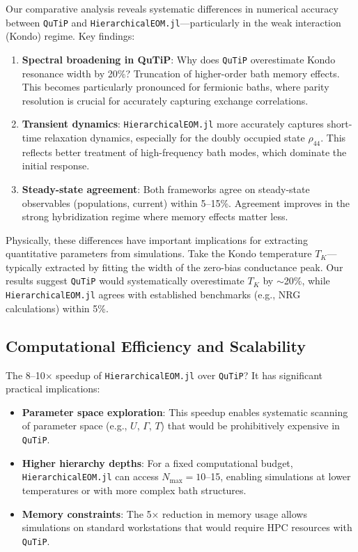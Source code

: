 \documentclass[preprint,1p]{elsarticle}
\begin{document}
Our comparative analysis reveals systematic differences in numerical accuracy between \texttt{QuTiP} and \texttt{HierarchicalEOM.jl}—particularly in the weak interaction (Kondo) regime. Key findings:

\begin{enumerate}
    \item \textbf{Spectral broadening in QuTiP}: Why does \texttt{QuTiP} overestimate Kondo resonance width by 20\%? Truncation of higher-order bath memory effects. This becomes particularly pronounced for fermionic baths, where parity resolution is crucial for accurately capturing exchange correlations.
    
    \item \textbf{Transient dynamics}: \texttt{HierarchicalEOM.jl} more accurately captures short-time relaxation dynamics, especially for the doubly occupied state $\rho_{44}$. This reflects better treatment of high-frequency bath modes, which dominate the initial response.
    
    \item \textbf{Steady-state agreement}: Both frameworks agree on steady-state observables (populations, current) within 5--15\%. Agreement improves in the strong hybridization regime where memory effects matter less.
\end{enumerate}

Physically, these differences have important implications for extracting quantitative parameters from simulations. Take the Kondo temperature $T_K$—typically extracted by fitting the width of the zero-bias conductance peak. Our results suggest \texttt{QuTiP} would systematically overestimate $T_K$ by $\sim$20\%, while \texttt{HierarchicalEOM.jl} agrees with established benchmarks (e.g., NRG calculations) within 5\%.

\subsection{Computational Efficiency and Scalability}

The 8--10× speedup of \texttt{HierarchicalEOM.jl} over \texttt{QuTiP}? It has significant practical implications:

\begin{itemize}
    \item \textbf{Parameter space exploration}: This speedup enables systematic scanning of parameter space (e.g., $U$, $\Gamma$, $T$) that would be prohibitively expensive in \texttt{QuTiP}.
    
    \item \textbf{Higher hierarchy depths}: For a fixed computational budget, \texttt{HierarchicalEOM.jl} can access $N_{\text{max}} = 10$--15, enabling simulations at lower temperatures or with more complex bath structures.
    
    \item \textbf{Memory constraints}: The 5× reduction in memory usage allows simulations on standard workstations that would require HPC resources with \texttt{QuTiP}.
\end{itemize}
\end{document}
